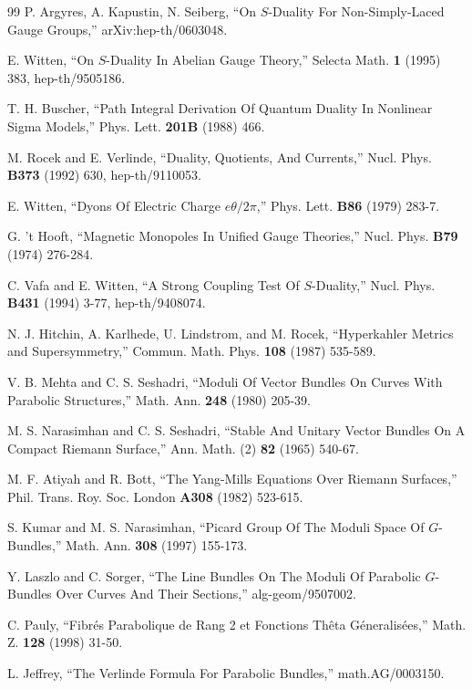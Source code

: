 \begin{thebibliography}{99}
 P. Argyres, A. Kapustin, N. Seiberg, ``On $S$-Duality For Non-Simply-Laced Gauge
Groups,'' arXiv:hep-th/0603048.

 E. Witten, ``On $S$-Duality In Abelian Gauge
Theory,'' Selecta Math. {\bf 1} (1995) 383, hep-th/9505186.

 T. H. Buscher, ``Path Integral
Derivation Of Quantum Duality In Nonlinear Sigma
Models,'' Phys. Lett. {\bf 201B} (1988) 466.

 M. Rocek and E. Verlinde, ``Duality, Quotients,
And Currents,'' Nucl. Phys. {\bf B373} (1992) 630,
hep-th/9110053.

 E. Witten, ``Dyons Of Electric Charge
$e\theta/2\pi$,'' Phys. Lett. {\bf B86} (1979) 283-7.

 G. 't Hooft, ``Magnetic Monopoles In Unified
Gauge Theories,'' Nucl. Phys. {\bf B79} (1974) 276-284.

 C. Vafa and E. Witten, ``A Strong
Coupling Test Of $S$-Duality,'' Nucl. Phys. {\bf B431} (1994) 3-77, hep-th/9408074.

 N. J.
Hitchin, A. Karlhede, U. Lindstrom, and M. Rocek, ``Hyperkahler
Metrics and Supersymmetry,'' Commun. Math. Phys. {\bf 108} (1987)
535-589.

 V. B. Mehta and C. S. Seshadri, ``Moduli Of
Vector Bundles On Curves With Parabolic Structures,'' Math. Ann. {\bf 248} (1980) 205-39.

 M. S. Narasimhan and C. S. Seshadri, ``Stable And Unitary Vector Bundles
On A Compact Riemann Surface,'' Ann. Math. (2) {\bf 82} (1965) 540-67.

 M. F. Atiyah and R. Bott, ``The Yang-Mills Equations Over
Riemann Surfaces,'' Phil. Trans. Roy. Soc. London {\bf A308}
(1982) 523-615.

 S. Kumar and
M. S. Narasimhan, ``Picard Group Of The Moduli Space Of $G$-Bundles,'' Math. Ann.
{\bf 308} (1997) 155-173.

 Y. Laszlo and C. Sorger, ``The Line Bundles On The Moduli Of
Parabolic $G$-Bundles Over Curves And Their Sections,'' alg-geom/9507002.

 C. Pauly, ``Fibr\'es Parabolique de Rang 2 et Fonctions Th\^eta
G\'eneralis\'ees,'' Math. Z. {\bf 128} (1998) 31-50.

 L. Jeffrey, ``The Verlinde Formula For Parabolic Bundles,'' math.AG/0003150.


\end{thebibliography}

